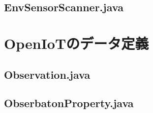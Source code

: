 \documentclass{kuisthesis}			%
\begin{document}
\subsection{EnvSensorScanner.java}


\section{OpenIoTのデータ定義}
\subsection{Observation.java}


\subsection{ObserbatonProperty.java}

\end{document}

